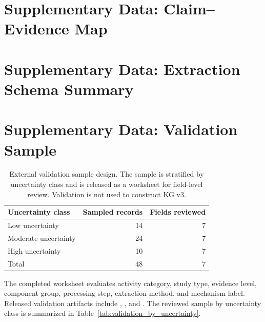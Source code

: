 \documentclass[11pt]{article}
\begin{document}
\section{Supplementary Data: Claim--Evidence Map}
\label{app:claim_evidence_map}



\section{Supplementary Data: Extraction Schema Summary}
\label{app:extraction_schema}



\section{Supplementary Data: Validation Sample}
\label{app:validation}

\begin{table}[htbp]
\centering
\small
\caption{External validation sample design. The sample is stratified by uncertainty class and is released as a worksheet for field-level review. Validation is not used to construct KG v3.}
\label{tab:validation_sample}
\begin{tabular}{lrr}
\toprule
Uncertainty class & Sampled records & Fields reviewed \\
\midrule
Low uncertainty & 14 & 7 \\
Moderate uncertainty & 24 & 7 \\
High uncertainty & 10 & 7 \\
\midrule
Total & 48 & 7 \\
\bottomrule
\end{tabular}
\end{table}

The completed worksheet evaluates activity category, study type, evidence level, component group, processing step, extraction method, and mechanism label. Released validation artifacts include , , and . The reviewed sample by uncertainty class is summarized in Table~\ref{tab:validation_by_uncertainty}.





\end{document}
